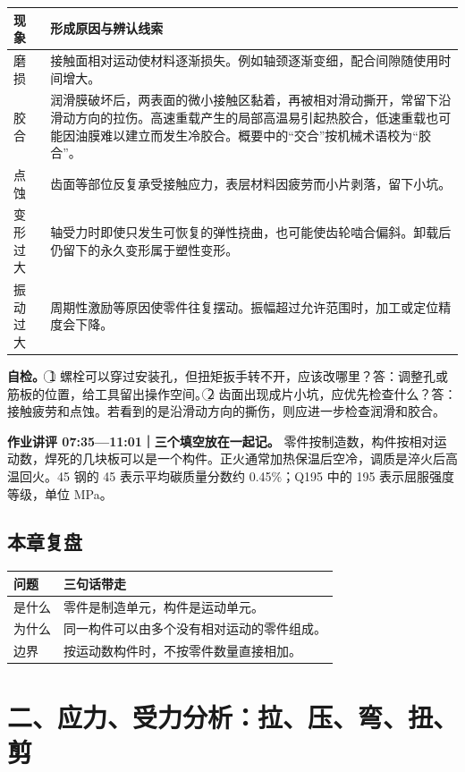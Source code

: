 \documentclass[zihao=5,a4paper,UTF8,fontset=fandol]{ctexart}
\begin{document}
\begin{longtable}{p{7.51cm}p{7.51cm}}
\toprule
现象 & 形成原因与辨认线索 \\

\midrule
\endhead
磨损 & 接触面相对运动使材料逐渐损失。例如轴颈逐渐变细，配合间隙随使用时间增大。 \\
胶合 & 润滑膜破坏后，两表面的微小接触区黏着，再被相对滑动撕开，常留下沿滑动方向的拉伤。高速重载产生的局部高温易引起热胶合，低速重载也可能因油膜难以建立而发生冷胶合。概要中的“交合”按机械术语校为“胶合”。 \\
点蚀 & 齿面等部位反复承受接触应力，表层材料因疲劳而小片剥落，留下小坑。 \\
变形过大 & 轴受力时即使只发生可恢复的弹性挠曲，也可能使齿轮啮合偏斜。卸载后仍留下的永久变形属于塑性变形。 \\
振动过大 & 周期性激励等原因使零件往复摆动。振幅超过允许范围时，加工或定位精度会下降。 \\
\bottomrule
\end{longtable}

\textbf{自检。} \textcircled{1} 螺栓可以穿过安装孔，但扭矩扳手转不开，应该改哪里？答：调整孔或筋板的位置，给工具留出操作空间。\textcircled{2} 齿面出现成片小坑，应优先检查什么？答：接触疲劳和点蚀。若看到的是沿滑动方向的撕伤，则应进一步检查润滑和胶合。


\textbf{作业讲评 07:35—11:01｜三个填空放在一起记。} 零件按制造数，构件按相对运动数，焊死的几块板可以是一个构件。正火通常加热保温后空冷，调质是淬火后高温回火。45 钢的 45 表示平均碳质量分数约 0.45\%；Q195 中的 195 表示屈服强度等级，单位 MPa。




\subsection{本章复盘}

\begin{longtable}{p{7.51cm}p{7.51cm}}
\toprule
问题 & 三句话带走 \\

\midrule
\endhead
是什么 & 零件是制造单元，构件是运动单元。 \\
为什么 & 同一构件可以由多个没有相对运动的零件组成。 \\
边界 & 按运动数构件时，不按零件数量直接相加。 \\
\bottomrule
\end{longtable}

\section{二、应力、受力分析：拉、压、弯、扭、剪}
\end{document}

